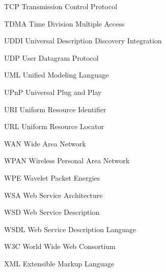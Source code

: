   {TCP}
  {Transmission Control Protocol}

  {TDMA}
  {Time Division Multiple Access}

  {UDDI}
  {Universal Description Discovery Integration}

  {UDP}
  {User Datagram Protocol}

  {UML}
  {Unified Modeling Language}


  {UPnP}
  {Universal Plug and Play}

  {URI}
  {Uniform Resource Identifier}

  {URL}
  {Uniform Resource Locator}

  {WAN}
  {Wide Area Network}

  {WPAN}
  {Wireless Personal Area Network}

  {WPE}
  {Wavelet Packet Energies}

  {WSA}
  {Web Service Architecture}

  {WSD}
  {Web Service Description}

  {WSDL}
  {Web Service Description Language}

  {W3C}
  {World Wide Web Consortium}

  {XML}
  {Extensible Markup Language}
